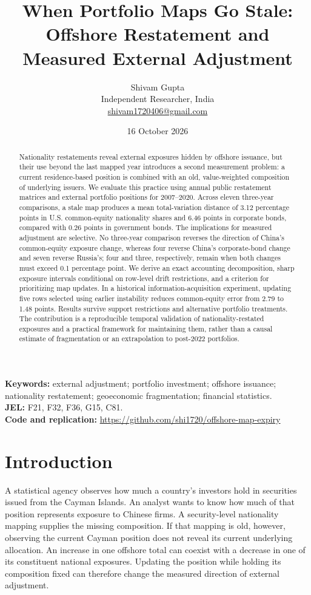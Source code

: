 \documentclass[11pt,a4paper]{article}
\title{When Portfolio Maps Go Stale:\\Offshore Restatement and Measured External Adjustment}
\author{Shivam Gupta\\\small Independent Researcher, India\\\small\href{mailto:shivam1720406@gmail.com}{shivam1720406@gmail.com}}
\date{16 October 2026}
\begin{document}
\maketitle
\begin{abstract}
Nationality restatements reveal external exposures hidden by offshore issuance, but their use beyond the last mapped year introduces a second measurement problem: a current residence-based position is combined with an old, value-weighted composition of underlying issuers. We evaluate this practice using annual public restatement matrices and external portfolio positions for 2007--2020. Across eleven three-year comparisons, a stale map produces a mean total-variation distance of 3.12 percentage points in U.S. common-equity nationality shares and 6.46 points in corporate bonds, compared with 0.26 points in government bonds. The implications for measured adjustment are selective. No three-year comparison reverses the direction of China's common-equity exposure change, whereas four reverse China's corporate-bond change and seven reverse Russia's; four and three, respectively, remain when both changes must exceed 0.1 percentage point. We derive an exact accounting decomposition, sharp exposure intervals conditional on row-level drift restrictions, and a criterion for prioritizing map updates. In a historical information-acquisition experiment, updating five rows selected using earlier instability reduces common-equity error from 2.79 to 1.48 points. Results survive support restrictions and alternative portfolio treatments. The contribution is a reproducible temporal validation of nationality-restated exposures and a practical framework for maintaining them, rather than a causal estimate of fragmentation or an extrapolation to post-2022 portfolios.
\end{abstract}
\vspace{3pt}
\noindent\textbf{Keywords:} external adjustment; portfolio investment; offshore issuance; nationality restatement; geoeconomic fragmentation; financial statistics.\\
\noindent\textbf{JEL:} F21, F32, F36, G15, C81.\\
\noindent\textbf{Code and replication:} \url{https://github.com/shi1720/offshore-map-expiry}

\section{Introduction}
A statistical agency observes how much a country's investors hold in securities issued from the Cayman Islands. An analyst wants to know how much of that position represents exposure to Chinese firms. A security-level nationality mapping supplies the missing composition. If that mapping is old, however, observing the current Cayman position does not reveal its current underlying allocation. An increase in one offshore total can coexist with a decrease in one of its constituent national exposures. Updating the position while holding its composition fixed can therefore change the measured direction of external adjustment.
\end{document}
